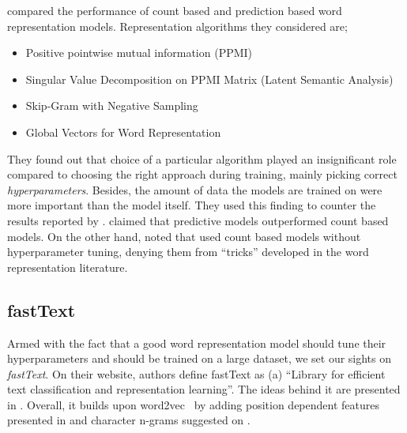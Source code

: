 \textcite{levy_improving_2015} compared the performance of count based and prediction based word representation models.
Representation algorithms they considered are;
\begin{itemize}
    \item Positive pointwise mutual information (PPMI)~\cite{church_word_1990, bullinaria_extracting_2007}
    \item Singular Value Decomposition on PPMI Matrix (Latent Semantic Analysis)~\cite{deerwester_indexing_1990}
    \item Skip-Gram with Negative Sampling~\cite{mikolov_distributed_2013}
    \item Global Vectors for Word Representation~\cite{pennington_glove_2014}
\end{itemize}
They found out that choice of a particular algorithm played an insignificant role compared to choosing the right approach during training, mainly picking correct \emph{hyperparameters}.
Besides, the amount of data the models are trained on were more important than the model itself.
They used this finding to counter the results reported by \textcite{baroni_dont_2014}.
\citeauthor{baroni_dont_2014} claimed that predictive models outperformed count based models.
On the other hand, \citeauthor{levy_improving_2015} noted that \citeauthor{baroni_dont_2014} used count based models without hyperparameter tuning, denying them from \enquote{tricks} developed in the word representation literature.

\subsection{fastText}%
\label{sub:fasttext}

Armed with the fact that a good word representation model should tune their hyperparameters and should be trained on a large dataset, we set our sights on \emph{fastText}.
On their website, authors define fastText as (a) \enquote{Library for efficient text classification and representation learning}.
The ideas behind it are presented in \textcite{mikolov2018advances}.
Overall, it builds upon word2vec~\cite{mikolov_distributed_2013} by adding position dependent features presented in \textcite{mnih_learning_2013} and character n-grams suggested on \textcite{bojanowski_enriching_2016}.


